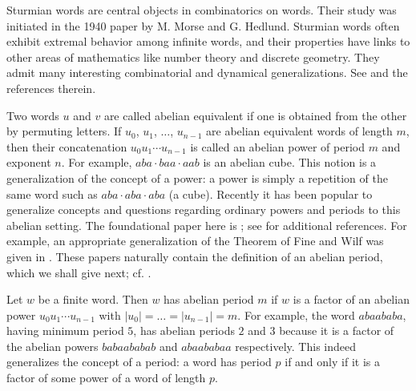 \documentclass[a4paper,fleqn]{article}
\providecommand{\abs}[1]{\lvert#1\rvert}
\begin{document}
  Sturmian words are central objects in combinatorics on words. Their study was initiated in the 1940 paper
  \cite{1940:symbolic_dynamics_ii} by M. Morse and G. Hedlund. Sturmian words often exhibit extremal behavior among
  infinite words, and their properties have links to other areas of mathematics like number theory and discrete
  geometry. They admit many interesting combinatorial and dynamical generalizations. See
  \cite{1996:recent_results_on_sturmian_words,2009:episturmian_words_a_survey} and the references therein.

  Two words $u$ and $v$ are called abelian equivalent if one is obtained from the other by permuting letters. If $u_0$,
  $u_1$, $\ldots$, $u_{n-1}$ are abelian equivalent words of length $m$, then their concatenation
  $u_0 u_1 \dotsm u_{n-1}$ is called an abelian power of period $m$ and exponent $n$. For example,
  $aba \cdot baa \cdot aab$ is an abelian cube. This notion is a generalization of the concept of a power: a power is
  simply a repetition of the same word such as $aba \cdot aba \cdot aba$ (a cube). Recently it has been popular to
  generalize concepts and questions regarding ordinary powers and periods to this abelian setting. The foundational
  paper here is \cite{2011:abelian_complexity_of_minimal_subshifts}; see
  \cite{2016:abelian_powers_and_repetitions_in_sturmian_words} for additional references. For example, an appropriate
  generalization of the Theorem of Fine and Wilf was given in
  \cite{2006:fine_and_wilfs_theorem_for_abelian_periods,2013:abelian_periods_partial_words_and_an_extension,2016:an_abelian_periodicity_lemma}.
  These papers naturally contain the definition of an abelian period, which we shall give next; cf.
  \cite{2012:on_abelian_repetition_threshold}.
  
  Let $w$ be a finite word. Then $w$ has abelian period $m$ if $w$ is a factor of an abelian power $u_0 u_1 \dotsm
  u_{n-1}$ with $\abs{u_0} = \ldots = \abs{u_{n-1}} = m$. For example, the word $abaababa$, having minimum period $5$,
  has abelian periods $2$ and $3$ because it is a factor of the abelian powers $babaababab$ and $abaababaa$
  respectively. This indeed generalizes the concept of a period: a word has period $p$ if and only if it is a factor of
  some power of a word of length $p$.
  
\end{document}
